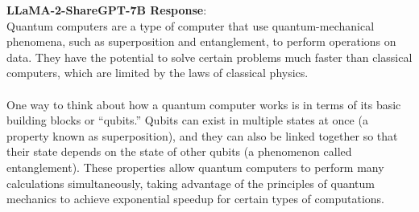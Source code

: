 \documentclass{article} %
\newcommand{\llama}{LLaMA}
\begin{document}
\begin{tcolorbox}[breakable,boxrule=0pt]
  \textbf{\llama{}-2-ShareGPT-7B Response}: \\Quantum computers are a type of computer that use quantum-mechanical phenomena, such as superposition and entanglement, to perform operations on data. They have the potential to solve certain problems much faster than classical computers, which are limited by the laws of classical physics.\\\\One way to think about how a quantum computer works is in terms of its basic building blocks or ``qubits.'' Qubits can exist in multiple states at once (a property known as superposition), and they can also be linked together so that their state depends on the state of other qubits (a phenomenon called entanglement). These properties allow quantum computers to perform many calculations simultaneously, taking advantage of the principles of quantum mechanics to achieve exponential speedup for certain types of computations.\\

\end{tcolorbox}
\end{document}
